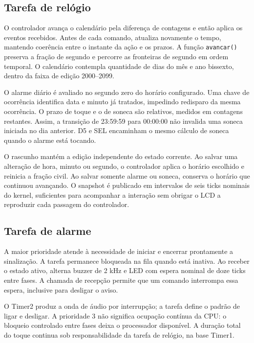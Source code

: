 \subsection{Tarefa de relógio}

O controlador avança o calendário pela diferença de contagens e então aplica os eventos recebidos. Antes de cada comando, atualiza novamente o tempo, mantendo coerência entre o instante da ação e os prazos. A função \texttt{avancar()} preserva a fração de segundo e percorre as fronteiras de segundo em ordem temporal. O calendário contempla quantidade de dias do mês e ano bissexto, dentro da faixa de edição 2000–2099.

O alarme diário é avaliado no segundo zero do horário configurado. Uma chave de ocorrência identifica data e minuto já tratados, impedindo redisparo da mesma ocorrência. O prazo de toque e o de soneca são relativos, medidos em contagens restantes. Assim, a transição de 23:59:59 para 00:00:00 não invalida uma soneca iniciada no dia anterior. D5 e SEL encaminham o mesmo cálculo de soneca quando o alarme está tocando.

O rascunho mantém a edição independente do estado corrente. Ao salvar uma alteração de hora, minuto ou segundo, o controlador aplica o horário escolhido e reinicia a fração civil. Ao salvar somente alarme ou soneca, conserva o horário que continuou avançando. O snapshot é publicado em intervalos de seis ticks nominais do kernel, suficientes para acompanhar a interação sem obrigar o LCD a reproduzir cada passagem do controlador.

\subsection{Tarefa de alarme}

A maior prioridade atende à necessidade de iniciar e encerrar prontamente a sinalização. A tarefa permanece bloqueada na fila quando está inativa. Ao receber o estado ativo, alterna buzzer de 2 kHz e LED com espera nominal de doze ticks entre fases. A chamada de recepção permite que um comando interrompa essa espera, inclusive para desligar o aviso.

O Timer2 produz a onda de áudio por interrupção; a tarefa define o padrão de ligar e desligar. A prioridade 3 não significa ocupação contínua da CPU: o bloqueio controlado entre fases deixa o processador disponível. A duração total do toque continua sob responsabilidade da tarefa de relógio, na base Timer1.

